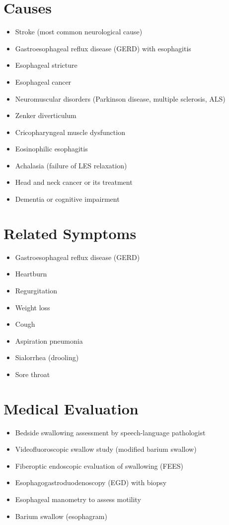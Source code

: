 \section*{Causes}
\begin{itemize}
\item Stroke (most common neurological cause)
\item Gastroesophageal reflux disease (GERD) with esophagitis
\item Esophageal stricture
\item Esophageal cancer
\item Neuromuscular disorders (Parkinson disease, multiple sclerosis, ALS)
\item Zenker diverticulum
\item Cricopharyngeal muscle dysfunction
\item Eosinophilic esophagitis
\item Achalasia (failure of LES relaxation)
\item Head and neck cancer or its treatment
\item Dementia or cognitive impairment
\end{itemize}

\section*{Related Symptoms}
\begin{itemize}
\item Gastroesophageal reflux disease (GERD)
\item Heartburn
\item Regurgitation
\item Weight loss
\item Cough
\item Aspiration pneumonia
\item Sialorrhea (drooling)
\item Sore throat
\end{itemize}

\section*{Medical Evaluation}
\begin{itemize}
\item Bedside swallowing assessment by speech-language pathologist
\item Videofluoroscopic swallow study (modified barium swallow)
\item Fiberoptic endoscopic evaluation of swallowing (FEES)
\item Esophagogastroduodenoscopy (EGD) with biopsy
\item Esophageal manometry to assess motility
\item Barium swallow (esophagram)
\end{itemize}

